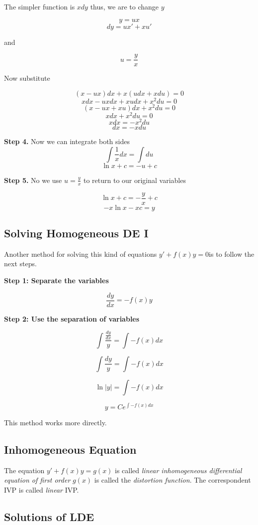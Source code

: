 The simpler function is \(xdy\) thus, we are to change \(y\)

\[y = ux\]
\[dy = ux' + xu'\]

and 

\[u = \frac{y}{x}\]

Now substitute

\[(x - ux)dx + x(udx + xdu) = 0\]
\[xdx - u x dx + x u dx + x^{2}du = 0\]
\[(x - ux + xu)dx + x^{2}du = 0\]
\[xdx + x^{2}du = 0\]
\[xdx = - x^{2}du\]
\[dx = - xdu\]

\textbf{Step 4.} Now we can integrate both sides
\[\int \frac{1}{x}dx = \int du\]
\[\ln x + c = -u + c\]

\textbf{Step 5.} No we use \(u = \frac{y}{x}\) to return to our original variables

\[\ln x + c = -\frac{y}{x} + c\]
\[-x\ln x - xc = y\]


\subsection{Solving Homogeneous DE I}

Another method for solving this kind of equations \(y' + f(x)y = 0\)is to follow the next steps.
\vspace{\baselineskip}

\textbf{Step 1: Separate the variables}

\[
\frac{dy}{dx} = -f(x)y
\]

\textbf{Step 2: Use the separation of variables}

\[
\int \frac{\frac{dy}{dx}}{y} = \int -f(x) dx
\]

\[
\int \frac{dy}{y} = \int -f(x) dx
\]

\[
    \ln|y| = \int -f(x) dx
\]

\[
    y = C e^{\int -f(x) dx}
\]

This method works more directly.

\subsection{Inhomogeneous Equation}

The equation \(y' + f(x)y = g(x)\) is called \emph{linear inhomogeneous differential equation of first order}
 \(g(x)\) is called the \emph{distortion function}. The correspondent IVP is called
\emph{linear} IVP\@.

\subsection{Solutions of LDE}

